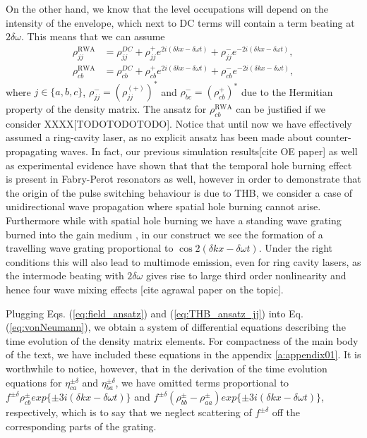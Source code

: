 \documentclass[journal]{IEEEtran}
\def\dw{\delta\omega}
\def\dk{\delta k}
\begin{document}
 On the other hand, we know that the level occupations will depend on the intensity of the envelope, which next to DC terms will contain a term beating at $2\delta \omega$. This means that we can assume 
\begin{subequations}
	\label{eq:THB_ansatz_jj}
\begin{align}
\rho^{\text{RWA}}_{jj} &= \rho_{jj}^{DC}+\rho_{jj}^{+}e^{2i(\delta k x-\delta \omega t)} + \rho_{jj}^{-}e^{-2i(\delta k x-\delta \omega t)}, \\
\rho^{\text{RWA}}_{cb} &= \rho_{cb}^{DC}+\rho_{cb}^{+}e^{2i(\delta k x-\delta \omega t)} + \rho_{cb}^{-}e^{-2i(\delta k x-\delta \omega t)},  
\end{align}
\end{subequations}
where $j \in \{a,b,c\}$, $\rho_{jj}^{-} = (\rho_{jj}^{(+)})^*$ and $\rho_{bc}^{-} = (\rho_{cb}^{+})^*$ due to the Hermitian property of the density matrix. The ansatz for $\rho^{\text{RWA}}_{cb}$ can be justified if we consider XXXX[TODOTODOTODO]. Notice that until now we have effectively assumed a ring-cavity laser, as no explicit ansatz has been made about counter-propagating waves. In fact, our previous simulation results[cite OE paper] as well as experimental evidence \cite{burghoff2015evaluating} have shown that that the temporal hole burning effect is present in Fabry-Perot resonators as well, however in order to demonstrate that the origin of the pulse switching behaviour is due to THB, we consider a case of unidirectional wave propagation where spatial hole burning cannot arise. Furthermore while with spatial hole burning we have a standing wave grating burned into the gain medium  \cite{gordon2008multimode}, in our construct we see the formation of a travelling wave grating proportional to $\cos2(\dk x- \dw t)$. Under the right conditions this will also lead to multimode emission, even for ring cavity lasers, as the intermode beating with $2\delta\omega$ gives rise to large third order nonlinearity and hence four wave mixing effects [cite agrawal paper on the topic]. 

Plugging Eqs. (\ref{eq:field_ansatz}) and (\ref{eq:THB_ansatz_jj}) into Eq. (\ref{eq:vonNeumann}), we obtain a system of differential equations describing the time evolution of the density matrix elements. For compactness of the main body of the text, we have included these equations in the appendix \ref{a:appendix01}. It is worthwhile to notice, however, that in the derivation of the time evolution equations for $\eta_{ca}^{\pm\delta}$ and $\eta_{ba}^{\pm\delta}$, we have omitted terms proportional to $f^{\pm\delta}\rho_{cb}^{\pm}exp\{\pm3i(\dk x - \dw t)\}$ and $f^{\pm\delta}(\rho_{bb}^{\pm}-\rho_{aa}^{\pm})exp\{\pm3i(\dk x - \dw t)\}$, respectively, which is to say that we neglect scattering of $f^{\pm\delta}$ off the corresponding parts of the grating.
\end{document}
